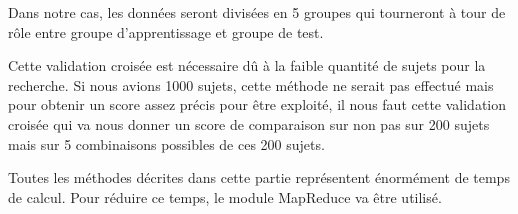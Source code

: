 Dans notre cas, les données seront divisées en 5 groupes qui tourneront à tour de rôle entre groupe d'apprentissage et groupe de test. 

Cette validation croisée est nécessaire dû à la faible quantité de sujets pour la recherche. Si nous avions 1000 sujets, cette méthode ne serait pas effectué mais pour obtenir un score assez précis pour être exploité, il nous faut cette validation croisée qui va nous donner un score de comparaison sur non pas sur 200 sujets mais sur 5 combinaisons possibles de ces 200 sujets. 

Toutes les méthodes décrites dans cette partie représentent énormément de temps de calcul.
Pour réduire ce temps, le module MapReduce va être utilisé. 
